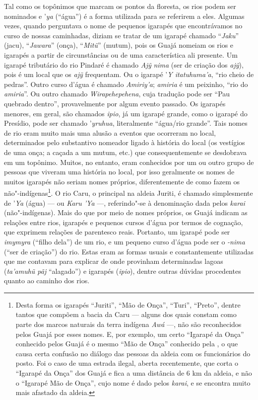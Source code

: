 Tal como os topônimos que marcam os pontos da floresta, os rios podem ser nominados 
e '\emph{ya} (``água'') é a forma utilizada para se
referirem a eles. Algumas vezes, quando perguntava o nome de pequenos
igarapés que encontrávamos no curso de nossas caminhadas, diziam se
tratar de um igarapé chamado ``\emph{Jaku}'' (jacu), ``\emph{Jawara}''
(onça), ``\emph{Mitũ}'' (mutum), pois os Guajá nomeiam os rios e igarapés
a partir de circunstâncias ou de uma característica ali presente. Um
igarapé tributário do rio Pindaré é chamado \emph{Ajỹ} \emph{nima} (ser
de criação dos \emph{ajỹ}), pois é um local que os \emph{ajỹ}
frequentam. Ou o igarapé '\emph{Y itatuhuma'a}, ``rio cheio de pedras''.
Outro curso d'água é chamado \emph{Amiriy'a}; \emph{amiria} é um
peixinho, ``rio do \emph{amiria}''. Ou outro chamado
\emph{Wirapehepehena}, cuja tradução pode ser  ``Pau quebrado dentro'',
provavelmente por algum evento passado. Os igarapés menores, em geral,
são chamados \emph{ipio}, já um igarapé grande, como o igarapé do
Presídio, pode ser chamado '\emph{yruhua}, literalmente ``água/rio
grande''. Tais nomes de rio eram muito mais uma alusão a eventos que
ocorreram no local, determinados pelo substantivo nomeador ligado à
história do local (os vestígios de uma onça; a caçada a um mutum, etc.)
que consequentemente se desdobrava em um topônimo. Muitos, no entanto,
eram conhecidos por um ou outro grupo de pessoas que viveram uma
história no local, por isso geralmente os nomes de muitos igarapés não
seriam nomes próprios, diferentemente de como fazem os
não"-indígenas\footnote{Desta forma os igarapés ``Juriti'', ``Mão de Onça'',
  ``Turi'', ``Preto'', dentre tantos que compõem a bacia da Caru --- alguns
  dos quais constam como parte dos marcos naturais da terra indígena
  \emph{Awá} ---, não são reconhecidos pelos Guajá por esses nomes. E, por
  exemplo, um certo ``Igarapé da Onça'' conhecido pelos Guajá é o mesmo
  ``Mão de Onça'' conhecido pela , o que causa certa confusão no
  diálogo das pessoas da aldeia com os funcionários do posto. Foi o caso
  de uma estrada ilegal, aberta recentemente, que corta o ``Igarapé da
      Onça'' dos Guajá e fica a uma distância de 6 km da aldeia, e não o
  ``Igarapé Mão de Onça'', cujo nome é dado pelos \emph{karai}, e se
  encontra muito mais afastado da aldeia.}. O rio Caru, o principal na
aldeia Juriti, é chamado simplesmente de '\emph{Ya} (água) --- ou
\emph{Karu 'Ya} ---, referindo"-se à denominação dada pelos \emph{karai}
(não"-indígenas). Mais do que por meio de nomes próprios, os Guajá
indicam as relações entre rios, igarapés e pequenos cursos d'água por
termos de cognação, que exprimem relações de parentesco reais. Portanto,
um igarapé pode ser \emph{imymyra} (``filho dela'') de um rio, e um
pequeno curso d'água pode ser o \emph{-nima} (``ser de criação'') do rio.
Estas eram as formas usuais e constantemente utilizadas que me contavam
para explicar de onde provinham determinadas lagoas (\emph{ta'amuhũ pãj}
``alagado'') e igarapés (\emph{ipio}), dentre outras dúvidas procedentes
quanto ao caminho dos rios.

